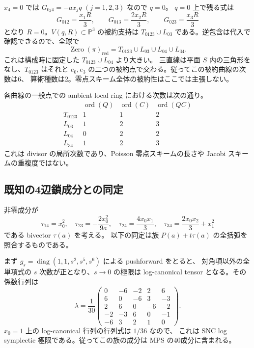 $x_4=0$ では $G_{0j4}=-ax_jq$ $(j=1,2,3)$ なので $q=0$。
$q=0$ 上で残る式は
\[
 G_{012}=\frac{x_1R}{3},\qquad
 G_{013}=\frac{2x_2R}{3},\qquad
 G_{023}=\frac{x_3R}{3}
\]
となり $R=0$。$V(q,R)\subset\mathbb P^3$ の被約支持は
$T_{0123}\cup L_{03}$ である。逆包含は代入で確認できるので、全球で
\[
 \boxed{\operatorname{Zero}(\pi)_{\mathrm{red}}
 =T_{0123}\cup L_{03}\cup L_{04}\cup L_{34}.}
\]
これは構成時に固定した $T_{0123}\cup L_{04}$ より大きい。
三直線は平面 $S$ 内の三角形をなし、$T_{0123}$ はそれと
$e_0,e_3$ の二つの被約点で交わる。従ってこの被約曲線の次数は6、
算術種数は2。零点スキーム全体の被約性はここでは主張しない。

各曲線の一般点での ambient local ring における次数は次の通り。
\[
\begin{array}{c|ccc}
 &\operatorname{ord}(Q)&\operatorname{ord}(C)&\operatorname{ord}(QC)\\\hline
 T_{0123}&1&1&2\\
 L_{03}&1&2&3\\
 L_{04}&0&2&2\\
 L_{34}&1&2&3
\end{array}
\]
これは divisor の局所次数であり、Poisson 零点スキームの長さや
Jacobi スキームの重複度ではない。

\subsection{既知の4辺鎖成分との同定}

非零成分が
\[
 \tau_{14}=x_0^2,\quad
 \tau_{23}=-\frac{2x_0^2}{9a},\quad
 \tau_{24}=\frac{4x_0x_1}{3},\quad
 \tau_{34}=\frac{2x_0x_2}{3}+x_1^2
\]
である bivector $\tau(a)$ を考える。
以下の同定は族 $P(a)+t\tau(a)$ の全括弧を照合するものである。

まず $g_s=\operatorname{diag}(1,1,s^2,s^5,s^6)$ による pushforward をとると、
対角項以外の全単項式の $s$ 次数が正となり、$s\to0$ の極限は
log-canonical tensor となる。その係数行列は
\[
 \lambda=\frac1{30}
 \begin{pmatrix}
 0&-6&-2&2&6\\
 6&0&-6&3&-3\\
 2&6&0&-6&-2\\
 -2&-3&6&0&-1\\
 -6&3&2&1&0
 \end{pmatrix}.
\]
$x_0=1$ 上の log-canonical 行列の行列式は $1/36$ なので、
これは SNC log symplectic 極限である。従ってこの族の成分は
MPS の40成分に含まれる\cite[Theorem 1.4]{MPStorelli}。

